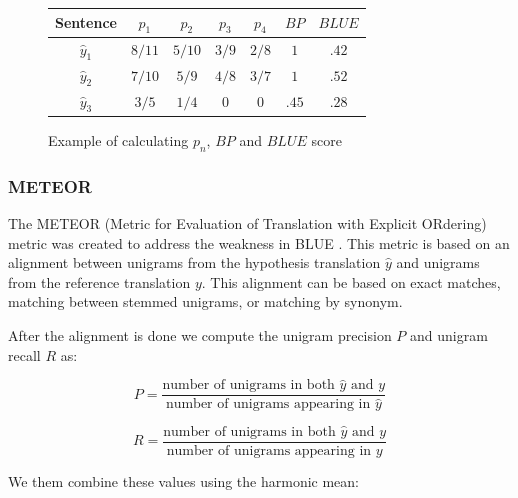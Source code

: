 \begin{figure}[h]
\label{bluetable}
\begin{center}
\begin{tabular}{|c|c|c|c|c|c|c|}
\hline
\cellcolor{blue!10} Sentence & \cellcolor{blue!10} $p_1$ & \cellcolor{blue!10} $p_2$ & \cellcolor{blue!10} $p_3$ & \cellcolor{blue!10} $p_4$ & \cellcolor{blue!10} $BP$ & \cellcolor{blue!10} $BLUE$ \\ \hline
\cellcolor{blue!10} $\hat{y}_1$ & $8/11$ & $5/10$ & $3/9$ & $2/8$ & $1$ & $.42$\\ \hline
\cellcolor{blue!10} $\hat{y}_2$ & $7/10$ & $5/9$ & $4/8$ & $3/7$ & $1$ & $.52$\\ \hline
\cellcolor{blue!10} $\hat{y}_3$ & $3/5$ & $1/4$ & $0$ & $0$ & $.45$ & $.28$\\ \hline
\end{tabular}
\end{center}
\caption{Example of calculating $p_n$, $BP$ and $BLUE$ score}
\end{figure}

\subsubsection{METEOR}



The METEOR (Metric for Evaluation of Translation with Explicit ORdering) metric was created to address the weakness in BLUE \cite{Lavie}. This metric is based on an alignment between unigrams from the hypothesis translation $\hat{y}$ and unigrams from the reference translation $y$. This alignment can be based on exact matches, matching between stemmed unigrams, or matching by synonym.

After the alignment is done we compute the unigram precision $P$ and unigram recall $R$ as:

\begin{equation*}
P = \frac{\text{number of } \text{unigrams in both } \hat{y} \text{ and } y}{\text{number of } \text{unigrams appearing in } \hat{y}}
\end{equation*}    


\begin{equation*}
R = \frac{\text{number of } \text{unigrams in both } \hat{y} \text{ and } y}{\text{number of } \text{unigrams appearing in } y}
\end{equation*}    

We them combine these values using the harmonic mean:

